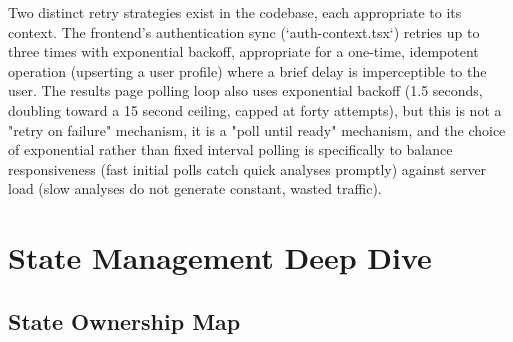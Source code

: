 \documentclass[11pt,a4paper]{report}
\begin{document}
Two distinct retry strategies exist in the codebase, each appropriate to its context. The frontend's authentication sync (`auth-context.tsx`) retries up to three times with exponential backoff, appropriate for a one-time, idempotent operation (upserting a user profile) where a brief delay is imperceptible to the user. The results page polling loop also uses exponential backoff (1.5 seconds, doubling toward a 15 second ceiling, capped at forty attempts), but this is not a "retry on failure" mechanism, it is a "poll until ready" mechanism, and the choice of exponential rather than fixed interval polling is specifically to balance responsiveness (fast initial polls catch quick analyses promptly) against server load (slow analyses do not generate constant, wasted traffic).

\chapter{State Management Deep Dive}

\section{State Ownership Map}
\end{document}
